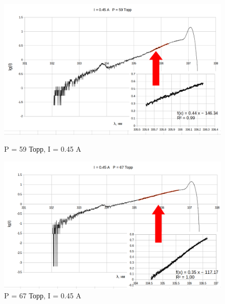 \documentclass[a4paper,12pt]{article}
\begin{document}
	\begin{figure}[h]
	\begin{center}
	\begin{minipage}[h]{0.45\linewidth}
	\includegraphics[width=1\linewidth]{P_59}
	\caption{P = 59 Торр, I = 0.45 A} %
	\end{minipage}
	\hfill
	\begin{minipage}[h]{0.45\linewidth}
	\includegraphics[width=1\linewidth]{p_67}
	\caption{P = 67 Торр, I = 0.45 A}
	\end{minipage}
	\end{center}
	\end{figure}
	
\end{document}
